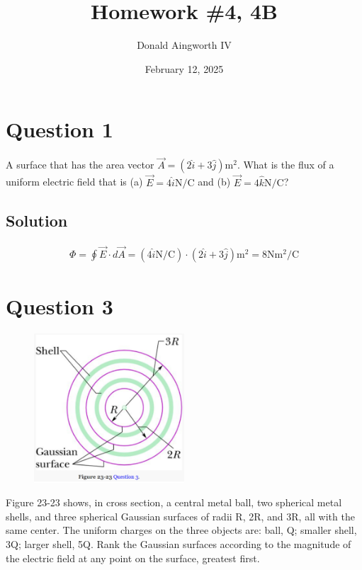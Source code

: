 \documentclass[12pt]{article}
\title{Homework \#4, 4B}
\author{Donald Aingworth IV}
\date{February 12, 2025}
\begin{document}

\maketitle

\section{Question 1}
A surface that has the area vector $\vec{A} = \left(2\hat{i} + 3\hat{j}\right) \unit{\meter^2}$. What is the flux of a uniform electric field that is (a) $\vec{E} = 4\hat{i} \unit{\newton/\coulomb}$ and (b) $\vec{E} = 4\hat{k} \unit{\newton/\coulomb}$?

\subsection{Solution}
\begin{gather*}
    \Phi = \oint \vec{E} \cdot d\vec{A}
        =   \left(4\hat{i} \unit{\newton/\coulomb}\right) \cdot \left(2\hat{i} + 3\hat{j}\right) \unit{\meter^2}
        =   8 \unit{\newton\meter^2/\coulomb}
\end{gather*}

\section{Question 3}
\begin{figure}
    \vspace{-30pt}
    \includegraphics[width=0.5\textwidth]{picture_2.png} 
\end{figure}
Figure 23-23 shows, in cross section, a central metal ball, two spherical metal shells, and three spherical Gaussian surfaces of radii R, 2R, and 3R, all with the same center. The uniform charges on the three objects are: ball, Q; smaller shell, 3Q; larger shell, 5Q. Rank the Gaussian surfaces according to the magnitude of the electric field at any point on the surface, greatest first.
\end{document}
